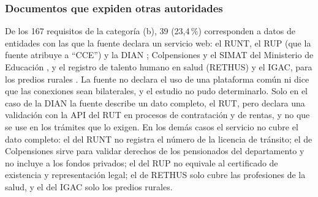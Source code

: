 \subsubsection{Documentos que expiden otras autoridades}

De los 167 requisitos de la categoría (b), 39 (23,4\,\%) corresponden a datos de entidades con las que la fuente declara un servicio web: el RUNT, el RUP (que la fuente atribuye a \enquote{CCE}) y la DIAN \parencite[p.~1]{gobernaciondelhuila2026datosmaestros}; Colpensiones y el SIMAT del Ministerio de Educación \parencite[p.~2]{gobernaciondelhuila2026datosmaestros}, y el registro de talento humano en salud (RETHUS) y el IGAC, para los predios rurales \parencite[p.~3]{gobernaciondelhuila2026datosmaestros}. La fuente no declara el uso de una plataforma común ni dice que las conexiones sean bilaterales, y el estudio no pudo determinarlo. Solo en el caso de la DIAN la fuente describe un dato completo, el RUT, pero declara una validación con la API del RUT en procesos de contratación y de rentas, y no que se use en los trámites que lo exigen. En los demás casos el servicio no cubre el dato completo: el del RUNT no registra el número de la licencia de tránsito; el de Colpensiones sirve para validar derechos de los pensionados del departamento y no incluye a los fondos privados; el del RUP no equivale al certificado de existencia y representación legal; el de RETHUS solo cubre las profesiones de la salud, y el del IGAC solo los predios rurales.

